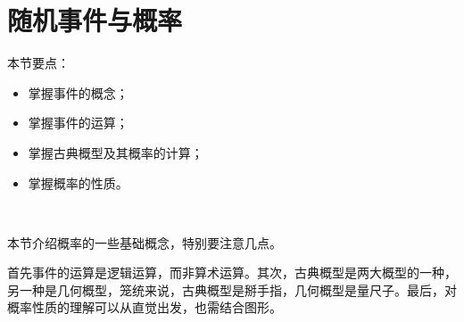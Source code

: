 \section{随机事件与概率}

本节要点：
\begin{itemize}
    \item 掌握事件的概念；
    \item 掌握事件的运算；
    \item 掌握古典概型及其概率的计算；
    \item 掌握概率的性质。
\end{itemize}

~

本节介绍概率的一些基础概念，特别要注意几点。

首先事件的运算是逻辑运算，而非算术运算。其次，古典概型是两大概型的一种，另一种是几何概型，笼统来说，古典概型是掰手指，几何概型是量尺子。最后，对概率性质的理解可以从直觉出发，也需结合图形。




